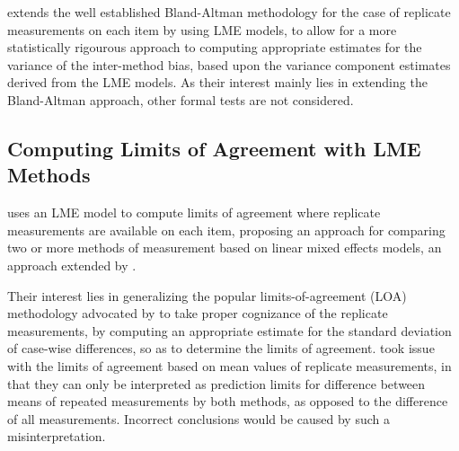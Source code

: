 \documentclass[12pt, a4paper]{report}
\theoremstyle{plain}
\theoremstyle{definition}
\theoremstyle{remark}
\begin{document}




\citet{BXC2008} extends the well established Bland-Altman methodology for the case of replicate measurements on each item by using LME models, to allow for a more statistically rigourous approach to computing appropriate estimates for the variance of the inter-method bias, based upon the variance component estimates derived from the LME models. As their interest mainly lies in extending the Bland-Altman approach, other formal tests are not considered.




\subsection{Computing Limits of Agreement with LME Methods }

\citet{BXC2004} uses an LME model to compute limits of agreement where replicate measurements are available on each item, proposing an approach for comparing two or more methods of measurement based on linear mixed effects models, an approach extended by \citet{BXC2008}.

Their interest lies in generalizing the popular limits-of-agreement (LOA) methodology advocated by \citet{BA86} to take proper cognizance of the replicate measurements, by computing an appropriate estimate for the standard deviation of case-wise differences, so as to determine the limits of agreement.
\citet{BXC2008} took issue with the limits of agreement based on mean values of replicate measurements, in that they can only be interpreted as prediction limits for difference between means of repeated measurements by both methods, as opposed to the difference of all measurements.
Incorrect conclusions would be caused by such a misinterpretation.
\end{document}
